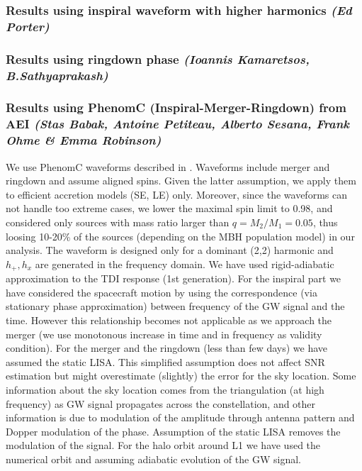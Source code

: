 \documentclass{iopart}
\begin{document}
\subsubsection{Results using inspiral waveform with higher harmonics  {\it (Ed Porter)}}
\label{SSS:MBHbPEInspHHEd}


\subsubsection{Results using ringdown phase  {\it (Ioannis Kamaretsos, B.Sathyaprakash)}}
\label{SSS:MBHbPERingdown}


\subsubsection{Results using PhenomC (Inspiral-Merger-Ringdown) from AEI {\it (Stas Babak, Antoine Petiteau, Alberto Sesana, Frank Ohme \& Emma Robinson)}}
\label{SSS:MBHbPEPhenomAEI}
We use PhenomC waveforms described in \cite{Santamaria:2010yb}. Waveforms include merger and ringdown and assume aligned spins. Given the latter assumption, we apply them to efficient accretion models (SE, LE) only. Moreover, since the waveforms can not handle too extreme cases, we lower the maximal spin limit to 0.98, and considered only sources with mass ratio larger than $q=M_2/M_1=0.05$, thus loosing 10-20\% of the sources (depending on the MBH population model) in our analysis. The waveform is designed only for a dominant (2,2) harmonic and $h_{+}, h_{x}$ are
generated in the frequency domain. We have used rigid-adiabatic approximation to the TDI response (1st generation). For the inspiral part 
we have considered the spacecraft motion by using the correspondence (via  stationary phase  approximation) between frequency of the GW signal 
and the time. However this relationship becomes not applicable as we approach the merger (we use monotonous increase in time and in frequency
as validity condition).  For the merger and the ringdown (less than few days) we have assumed the static LISA. This simplified assumption 
does not affect SNR estimation but might overestimate (slightly) the error for the sky location. Some information about the sky location 
comes from the triangulation (at high frequency) as GW signal propagates across the constellation, and other information is due to modulation of the 
amplitude through antenna pattern and Dopper modulation of the phase. Assumption of the static LISA removes the modulation of the signal.
For the halo orbit around L1 we have used the numerical orbit and assuming adiabatic evolution of the GW signal.
\end{document}
